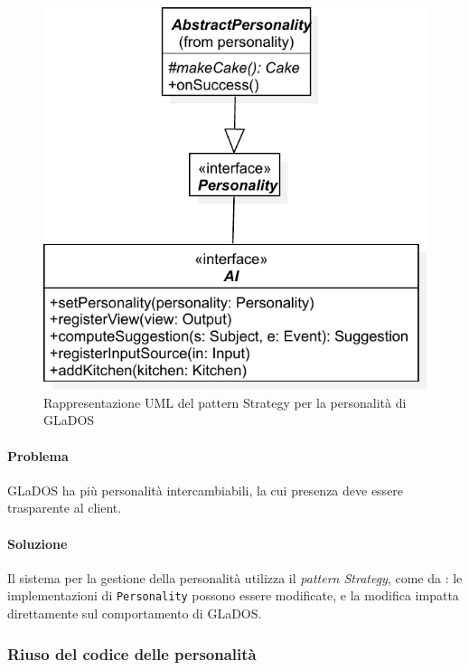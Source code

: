 \documentclass[a4paper,12pt]{report}
\begin{document}
\begin{figure}[H]
\centering{}
\includegraphics[width=\textwidth]{img/strategy}
\caption{Rappresentazione UML del pattern Strategy per la personalità di GLaDOS}
\label{img:strategy}
\end{figure}

\paragraph{Problema} GLaDOS ha più personalità intercambiabili, la cui presenza deve essere trasparente al client.

\paragraph{Soluzione} Il sistema per la gestione della personalità utilizza il \textit{pattern Strategy}, come da
: le implementazioni di \texttt{Personality} possono essere modificate, e la
modifica impatta direttamente sul comportamento di GLaDOS.

\subsubsection{Riuso del codice delle personalità}
\end{document}
